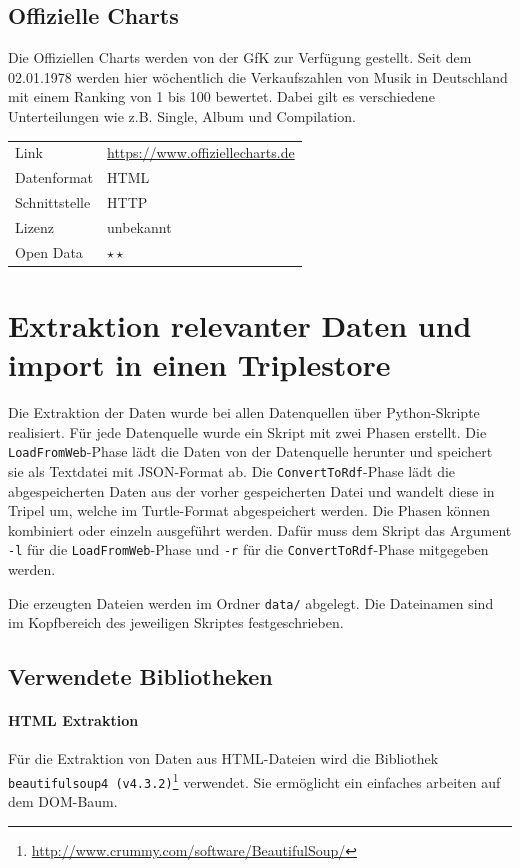 \documentclass[parskip]{scrartcl}
\begin{document}
\subsection{Offizielle Charts}

Die Offiziellen Charts werden von der GfK zur Verfügung gestellt. Seit dem 02.01.1978 werden hier wöchentlich die Verkaufszahlen von Musik in Deutschland mit einem Ranking von 1 bis 100 bewertet. Dabei gilt es verschiedene Unterteilungen wie z.B. Single, Album und Compilation.

\begin{tabular}{l|p{9cm}}
    Link & \url{https://www.offiziellecharts.de} \\
    Datenformat & HTML \\
    Schnittstelle & HTTP \\
    Lizenz & unbekannt \\
    Open Data & $\star\star$ \\
\end{tabular}

\section{Extraktion relevanter Daten und import in einen Triplestore }

Die Extraktion der Daten wurde bei allen Datenquellen über Python-Skripte realisiert. Für jede Datenquelle wurde ein Skript mit zwei Phasen erstellt. Die \texttt{LoadFromWeb}-Phase lädt die Daten von der Datenquelle herunter und speichert sie als Textdatei mit JSON-Format ab. Die \texttt{ConvertToRdf}-Phase lädt die abgespeicherten Daten aus der vorher gespeicherten Datei und wandelt diese in Tripel um, welche im Turtle-Format abgespeichert werden. Die Phasen können kombiniert oder einzeln ausgeführt werden. Dafür muss dem Skript das Argument \texttt{-l} für die \texttt{LoadFromWeb}-Phase und \texttt{-r} für die \texttt{ConvertToRdf}-Phase mitgegeben werden.

Die erzeugten Dateien werden im Ordner \texttt{data/} abgelegt. Die Dateinamen sind im Kopfbereich des jeweiligen Skriptes festgeschrieben.


\subsection{Verwendete Bibliotheken}

\paragraph{HTML Extraktion}
Für die Extraktion von Daten aus HTML-Dateien wird die Bibliothek \texttt{beautifulsoup4  (v4.3.2)}\footnote{\href{http://www.crummy.com/software/BeautifulSoup/}{http://www.crummy.com/software/BeautifulSoup/}} verwendet. Sie ermöglicht ein einfaches arbeiten auf dem DOM-Baum.
\end{document}
